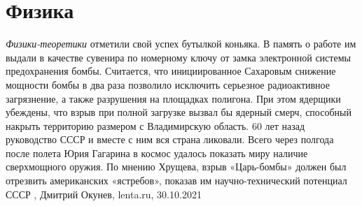  
 
 
 
 
\chapter{Физика}

\emph{Физики-теоретики} отметили свой успех бутылкой коньяка. В память о работе
им выдали в качестве сувенира по номерному ключу от замка электронной системы
предохранения бомбы. Считается, что инициированное Сахаровым снижение мощности
бомбы в два раза позволило исключить серьезное радиоактивное загрязнение, а
также разрушения на площадках полигона. При этом ядерщики убеждены, что взрыв
при полной загрузке вызвал бы ядерный смерч, способный накрыть территорию
размером с Владимирскую область.  60 лет назад руководство СССР и вместе с ним
вся страна ликовали. Всего через полгода после полета Юрия Гагарина в космос
удалось показать миру наличие сверхмощного оружия. По мнению Хрущева, взрыв
«Царь-бомбы» должен был отрезвить американских «ястребов», показав им
научно-технический потенциал СССР
, Дмитрий Окунев, lenta.ru, 30.10.2021
